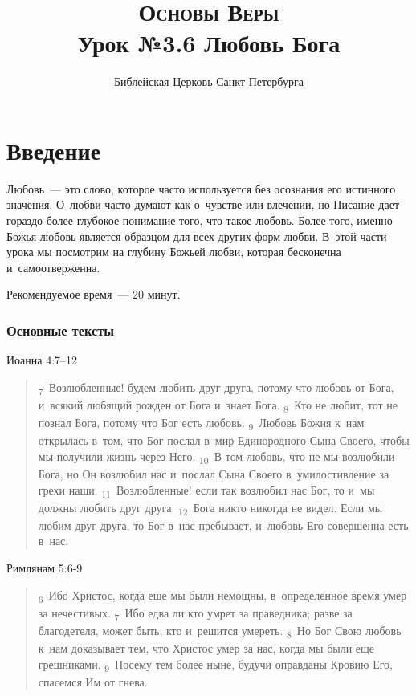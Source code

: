 \documentclass[a4paper,12pt]{article}
\title{\textsc{Основы Веры}\\Урок №3.6 Любовь Бога}
\author{Библейская Церковь Санкт-Петербурга}
\date{}
\begin{document}
\maketitle

\thispagestyle{empty}

\tableofcontents



\section*{Введение}

Любовь~--- это слово, которое часто используется без осознания его истинного значения. О~любви часто думают как о~чувстве или влечении, но Писание дает гораздо более глубокое понимание того, что такое любовь. Более того, именно Божья любовь является образцом для всех других форм любви. В~этой части урока мы посмотрим на глубину Божьей любви, которая бесконечна и~самоотверженна.

Рекомендуемое время~--- 20 минут.
        
\subsubsection*{Основные тексты}

 Иоанна 4:7–12

\begin{quote}
\textsubscript{7}~Возлюбленные! будем любить друг друга, потому что любовь от Бога, и~всякий любящий рожден от Бога и~знает Бога. 
\textsubscript{8}~Кто не любит, тот не познал Бога, потому что Бог есть любовь. 
\textsubscript{9}~Любовь Божия к~нам открылась в~том, что Бог послал в~мир Единородного Сына Своего, чтобы мы получили жизнь через Него. 
\textsubscript{10}~В том любовь, что не мы возлюбили Бога, но Он возлюбил нас и~послал Сына Своего в~умилостивление за грехи наши. 
\textsubscript{11}~Возлюбленные! если так возлюбил нас Бог, то и~мы должны любить друг друга. 
\textsubscript{12}~Бога никто никогда не видел. Если мы любим друг друга, то Бог в~нас пребывает, и~любовь Его совершенна есть в~нас. 
\end{quote}

\noindent Римлянам 5:6-9

\begin{quote}
\textsubscript{6}~Ибо Христос, когда еще мы были немощны, в~определенное время умер за нечестивых. 
\textsubscript{7}~Ибо едва ли кто умрет за праведника; разве за благодетеля, может быть, кто и~решится умереть. 
\textsubscript{8}~Но Бог Свою любовь к~нам доказывает тем, что Христос умер за нас, когда мы были еще грешниками. 
\textsubscript{9}~Посему тем более ныне, будучи оправданы Кровию Его, спасемся Им от гнева. 
\end{quote}
\end{document}
